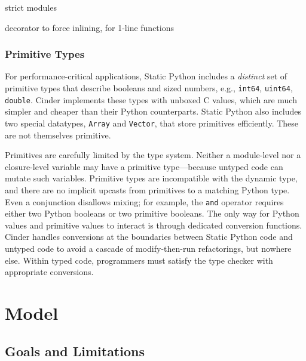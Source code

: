 \documentclass[english,cleveref,submission]{programming}
\newcommand{\SP}{Static Python}
\newcommand{\code}[1]{\texttt{#1}}
\begin{document}

strict modules

decorator to force inlining, for 1-line functions


\subsubsection{Primitive Types}

For performance-critical applications, \SP{} includes a \emph{distinct} set of primitive types
that describe booleans and sized numbers, e.g., \code{int64}, \code{uint64}, \code{double}.
Cinder implements these types with unboxed C values, which are much simpler and cheaper
than their Python counterparts.
\SP{} also includes two special datatypes, \code{Array} and \code{Vector}, that store primitives efficiently.
These are not themselves primitive.

Primitives are carefully limited by the type system.
Neither a module-level nor a closure-level variable may have a primitive
type---because untyped code can mutate such variables.
Primitive types are incompatible with the dynamic type,
and there are no implicit upcasts from primitives
to a matching Python type.
Even a conjunction disallows mixing; for example, the \code{and} operator
requires either two Python booleans or two primitive booleans.
The only way for Python values and primitive values to interact
is through dedicated conversion functions.
Cinder handles conversions at the boundaries between \SP{} code
and untyped code to avoid a cascade of modify-then-run refactorings, but nowhere else.
Within typed code, programmers must satisfy the type checker with
appropriate conversions.





\section{Model}
\label{s:model}


\subsection{Goals and Limitations}
\end{document}
